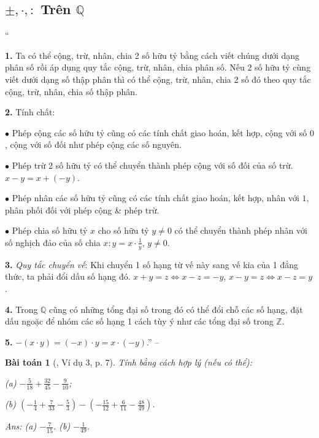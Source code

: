 \documentclass{article}
\numberwithin{equation}{section}
\newtheorem{baitoan}{Bài toán}
\begin{document}
\subsection{$\pm,\cdot,:$ Trên $\mathbb{Q}$}
``\begin{enumerate*}
	\item[\textbf{1.}] Ta có thể cộng, trừ, nhân, chia 2 số hữu tỷ bằng cách viết chúng dưới dạng phân số rồi áp dụng quy tắc cộng, trừ, nhân, chia phân số. Nếu 2 số hữu tỷ cùng viết dưới dạng số thập phân thì có thể cộng, trừ, nhân, chia 2 số đó theo quy tắc cộng, trừ, nhân, chia số thập phân.
	\item[\textbf{2.}] Tính chất:
	\begin{enumerate*}
		\item[$\bullet$] Phép cộng các số hữu tỷ cũng có các tính chất giao hoán, kết hợp, cộng với số $0$, cộng với số đối như phép cộng các số nguyên.
		\item[$\bullet$] Phép trừ 2 số hữu tỷ có thể chuyển thành phép cộng với số đối của số trừ. $x - y = x + (-y)$.
		\item[$\bullet$] Phép nhân các số hữu tỷ cũng có các tính chất giao hoán, kết hợp, nhân với $1$, phân phối đối với phép cộng \& phép trừ.
		\item[$\bullet$] Phép chia số hữu tỷ $x$ cho số hữu tỷ $y\ne 0$ có thể chuyển thành phép nhân với số nghịch đảo của số chia $x:y = x\cdot\frac{1}{y}$, $y\ne 0$.
	\end{enumerate*}
	\item[\textbf{3.}] \textit{Quy tắc chuyển vế}: Khi chuyển 1 số hạng từ vế này sang vế kia của 1 đẳng thức, ta phải đổi dấu số hạng đó. $x + y = z\Leftrightarrow x - z = -y$, $x - y = z\Leftrightarrow x - z = y$.
	\item[\textbf{4.}] Trong $\mathbb{Q}$ cũng có những tổng đại số trong đó có thể đổi chỗ các số hạng, đặt dấu ngoặc để nhóm các số hạng 1 cách tùy ý như các tổng đại số trong $\mathbb{Z}$.
	\item[\textbf{5.}] $-(x\cdot y) = (-x)\cdot y = x\cdot(-y)$.'' -- \cite[\S2, pp. 6--7]{Tuyen_Toan_7}
\end{enumerate*}

\begin{baitoan}[\cite{Tuyen_Toan_7}, Ví dụ 3, p. 7]
	Tính bằng cách hợp lý (nếu có thể):\\
	\begin{enumerate*}
		\item[(a)] $-\frac{5}{18} + \frac{32}{45} - \frac{9}{10}$;
		\item[(b)] $\left(-\frac{1}{4} + \frac{7}{33} - \frac{5}{3}\right) - \left(-\frac{15}{12} + \frac{6}{11} - \frac{48}{49}\right)$.
	\end{enumerate*}\hfill\textsf{Ans:} (a) $-\frac{7}{15}$. (b) $-\frac{1}{49}$.
\end{baitoan}
\end{document}
